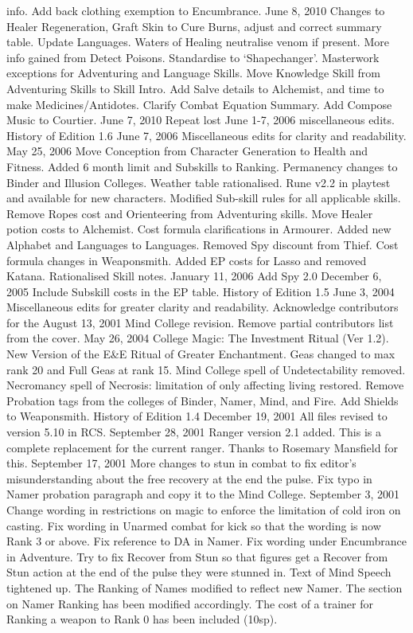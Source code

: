 \documentclass[a4paper]{article}
\begin{document}
\begin{multicols}{3}
info. Add back clothing exemption to Encumbrance.
June 8, 2010 Changes to Healer Regeneration,
Graft Skin to Cure Burns, adjust and correct summary table. Update Languages. Waters of Healing
neutralise venom if present. More info gained from
Detect Poisons. Standardise to ‘Shapechanger’.
Masterwork exceptions for Adventuring and Language Skills. Move Knowledge Skill from Adventuring Skills to Skill Intro. Add Salve details to
Alchemist, and time to make Medicines/Antidotes.
Clarify Combat Equation Summary. Add Compose
Music to Courtier.
June 7, 2010 Repeat lost June 1-7, 2006 miscellaneous edits.
History of Edition 1.6
June 7, 2006 Miscellaneous edits for clarity and
readability.
May 25, 2006 Move Conception from Character
Generation to Health and Fitness. Added 6 month
limit and Subskills to Ranking. Permanency
changes to Binder and Illusion Colleges. Weather
table rationalised. Rune v2.2 in playtest and available for new characters. Modified Sub-skill rules
for all applicable skills. Remove Ropes cost and
Orienteering from Adventuring skills. Move Healer
potion costs to Alchemist. Cost formula clarifications in Armourer. Added new Alphabet and Languages to Languages. Removed Spy discount from
Thief. Cost formula changes in Weaponsmith.
Added EP costs for Lasso and removed Katana.
Rationalised Skill notes.
January 11, 2006 Add Spy 2.0
December 6, 2005 Include Subskill costs in the EP
table.
History of Edition 1.5
June 3, 2004 Miscellaneous edits for greater clarity
and readability. Acknowledge contributors for the
August 13,
2001 Mind College revision. Remove partial contributors list from the cover.
May 26, 2004 College Magic: The Investment
Ritual (Ver 1.2). New Version of the E&E Ritual
of Greater Enchantment. Geas changed to max
rank 20 and Full Geas at rank 15. Mind College
spell of Undetectability removed. Necromancy
spell of Necrosis: limitation of only affecting living
restored. Remove Probation tags from the colleges
of Binder, Namer, Mind, and Fire. Add Shields to
Weaponsmith.
History of Edition 1.4
December 19, 2001 All files revised to version
5.10 in RCS.
September 28, 2001 Ranger version 2.1 added.
This is a complete replacement for the current
ranger. Thanks to Rosemary Mansfield for this.
September 17, 2001 More changes to stun in combat to fix editor’s misunderstanding about the free
recovery at the end the pulse. Fix typo in Namer
probation paragraph and copy it to the Mind College.
September 3, 2001 Change wording in restrictions
on magic to enforce the limitation of cold iron on
casting. Fix wording in Unarmed combat for kick
so that the wording is now Rank 3 or above. Fix
reference to DA in Namer. Fix wording under
Encumbrance in Adventure. Try to fix Recover
from Stun so that figures get a Recover from Stun
action at the end of the pulse they were stunned in.
Text of Mind Speech tightened up. The Ranking of
Names modified to reflect new Namer. The section
on Namer Ranking has been modified accordingly.
The cost of a trainer for Ranking a weapon to Rank
0 has been included (10sp).


\end{multicols}
\end{document}

